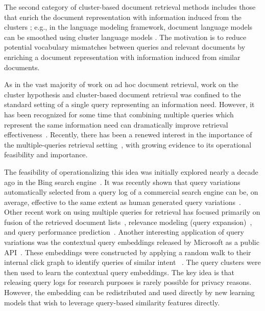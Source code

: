 The second category of cluster-based document retrieval methods
includes those that enrich the document representation with
information induced from the clusters
\cite{Singhal+Pereira:99a,Kurland+Lee:04a,Liu+Croft:04a,Kurland:09a};
e.g., in the language modeling framework, document language models
can be smoothed using cluster language models
\cite{Kurland+Lee:04a,Liu+Croft:04a,Kurland:09a}.
The motivation is to reduce potential vocabulary mismatches between
queries and relevant documents by enriching a document
representation with information induced from similar documents.

As in the vast majority of work on ad hoc document retrieval, work on
the cluster hypothesis and cluster-based document retrieval was
confined to the standard setting of a single query representing an
information need.
However, it has been recognized for some time that combining multiple
queries which represent the same information need can dramatically
improve retrieval effectiveness~\cite{Belkin+al:93a,Belkin+al:95a}.
Recently, there has been a renewed interest in the importance of
the multiple-queries retrieval
setting~\cite{bailey2016uqv100,bailey2017retrieval,bc17-adcs,Thomas+al:17a,Benham+al:19a,Liu+al:19a,Lu+al:19a,Zendel+al:19a},
with growing evidence to its operational feasibility and importance.

The feasibility of operationalizing this idea was initially explored
nearly a decade ago in the Bing search engine~{\cite{Sheldon+al:11a}}.
It was recently shown that query variations automatically selected
from a query log of a commercial search engine can be, on average,
effective to the same extent as human generated query
variations~\cite{Liu+al:19a}.  Other recent work on using multiple
queries for retrieval has focused primarily on fusion of the retrieved
document
lists~\cite{Belkin+al:93a,Belkin+al:95a,Pickens+al:08a,bailey2017retrieval,bc17-adcs},
relevance modeling (query expansion)~\cite{Lu+al:19a}, and query
performance prediction~{\cite{Zendel+al:19a}}. Another interesting
application of query variations was the contextual query embeddings
released by Microsoft as a public API~{\cite{zhang2019generic}}. These embeddings were constructed by applying a random walk to their internal click graph to
identify queries of similar intent ~{\cite{craswell2007random,Sheldon+al:11a,Liu+al:19a}}. The query clusters
were then used to learn the contextual query embeddings. The key idea
is that releasing query logs for research purposes is rarely possible
for privacy reasons. However, the embedding can be redistributed and
used directly by new learning models that wish to leverage query-based
similarity features directly.




